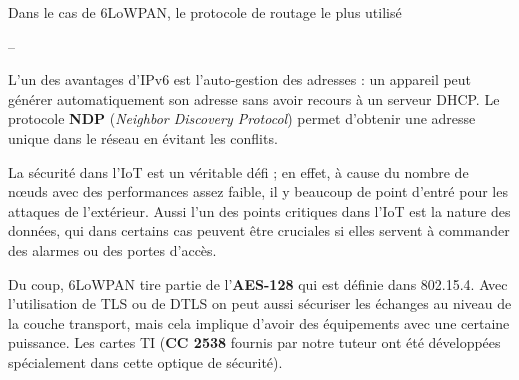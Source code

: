 Dans le cas de 6LoWPAN, le protocole de routage le plus utilisé 

 
--

L'un des avantages d'IPv6 est l'auto-gestion des adresses : un appareil peut générer automatiquement son adresse sans avoir recours à un serveur DHCP. Le protocole \textbf{NDP} (\textit{Neighbor Discovery Protocol}) permet d'obtenir une adresse unique dans le réseau en évitant les conflits.

La sécurité dans l'IoT est un véritable défi ; en effet, à cause du nombre de nœuds avec des performances assez faible, il y beaucoup de point d'entré pour les attaques de l'extérieur. Aussi l'un des points critiques dans l'IoT est la nature des données, qui dans certains cas peuvent être cruciales si elles servent à commander des alarmes ou des portes d'accès.

Du coup, 6LoWPAN tire partie de l'\textbf{AES-128} qui est définie dans 802.15.4. Avec l'utilisation de TLS ou de DTLS on peut aussi sécuriser les échanges au niveau de la couche transport, mais cela implique d'avoir des équipements avec une certaine puissance. Les cartes TI (\textbf{CC 2538} fournis par notre tuteur ont été développées spécialement dans cette optique de sécurité).

